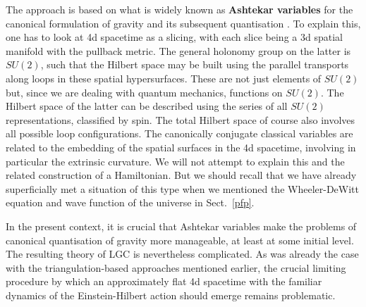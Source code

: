\documentclass[12pt]{article}
\numberwithin{equation}{section}
\begin{document}
The approach is based on what is widely known as {\bf Ashtekar variables} for the canonical formulation of gravity and its subsequent quantisation \cite{Sen:1982qb, Ashtekar:1986yd}. To explain this, one has to look at 4d spacetime as a slicing, with each slice being a 3d spatial manifold with the pullback metric. The general holonomy group on the latter is $SU(2)$, such that the Hilbert space may be built using the parallel transports along loops in these spatial hypersurfaces. These are not just elements of $SU(2)$ but, since we are dealing with quantum mechanics, functions on $SU(2)$. The Hilbert space of the latter can be described using the series of all $SU(2)$ representations, classified by spin. The total Hilbert space of course also involves all possible loop configurations. The canonically conjugate classical variables are related to the embedding of the spatial surfaces in the 4d spacetime, involving in particular the extrinsic curvature. We will not attempt to explain this and the related construction of a Hamiltonian. But we should recall that we have already superficially met a situation of this type when we mentioned the Wheeler-DeWitt equation and wave function of the universe in Sect.~\ref{pfp}.

In the present context, it is crucial that Ashtekar variables make the problems of canonical quantisation of gravity more manageable, at least at some initial level. The resulting theory of LGC is nevertheless complicated. As was already the case with the triangulation-based approaches mentioned earlier, the crucial limiting procedure by which an approximately flat 4d spacetime with the familiar dynamics of the Einstein-Hilbert action should emerge remains problematic.
\end{document}
